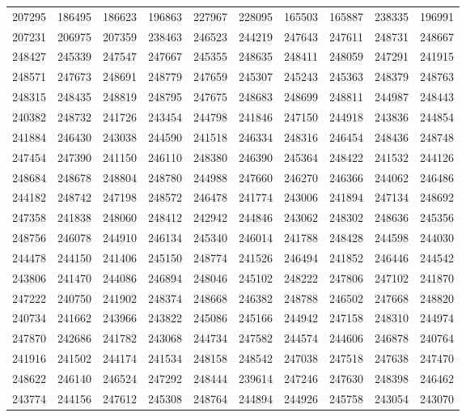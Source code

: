 {\begin{longtable}{rrrrrrrrrr}
207295 & 186495 & 186623 & 196863 & 227967 & 228095 & 165503 & 165887 & 238335 & 196991\\
207231 & 206975 & 207359 & 238463 & 246523 & 244219 & 247643 & 247611 & 248731 & 248667\\
248427 & 245339 & 247547 & 247667 & 245355 & 248635 & 248411 & 248059 & 247291 & 241915\\
248571 & 247673 & 248691 & 248779 & 247659 & 245307 & 245243 & 245363 & 248379 & 248763\\
248315 & 248435 & 248819 & 248795 & 247675 & 248683 & 248699 & 248811 & 244987 & 248443\\
240382 & 248732 & 241726 & 243454 & 244798 & 241846 & 247150 & 244918 & 243836 & 244854\\
241884 & 246430 & 243038 & 244590 & 241518 & 246334 & 248316 & 246454 & 248436 & 248748\\
247454 & 247390 & 241150 & 246110 & 248380 & 246390 & 245364 & 248422 & 241532 & 244126\\
248684 & 248678 & 248804 & 248780 & 244988 & 247660 & 246270 & 246366 & 244062 & 246486\\
244182 & 248742 & 247198 & 248572 & 246478 & 241774 & 243006 & 241894 & 247134 & 248692\\
247358 & 241838 & 248060 & 248412 & 242942 & 244846 & 243062 & 248302 & 248636 & 245356\\
248756 & 246078 & 244910 & 246134 & 245340 & 246014 & 241788 & 248428 & 244598 & 244030\\
244478 & 244150 & 241406 & 245150 & 248774 & 241526 & 246494 & 241852 & 246446 & 244542\\
243806 & 241470 & 244086 & 246894 & 248046 & 245102 & 248222 & 247806 & 247102 & 241870\\
247222 & 240750 & 241902 & 248374 & 248668 & 246382 & 248788 & 246502 & 247668 & 248820\\
240734 & 241662 & 243966 & 243822 & 245086 & 245166 & 244942 & 247158 & 248310 & 244974\\
247870 & 242686 & 241782 & 243068 & 244734 & 247582 & 244574 & 244606 & 246878 & 240764\\
241916 & 241502 & 244174 & 241534 & 248158 & 248542 & 247038 & 247518 & 247638 & 247470\\
248622 & 246140 & 246524 & 247292 & 248444 & 239614 & 247246 & 247630 & 248398 & 246462\\
243774 & 244156 & 247612 & 245308 & 248764 & 244894 & 244926 & 245758 & 243054 & 243070\\

\end{longtable}}
